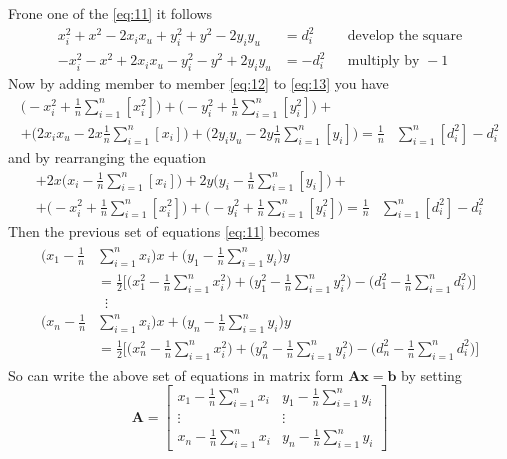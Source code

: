 \documentclass[12pt]{report}
\begin{document}
Frone one of the \ref{eq:11} it follows
\begin{align}
x_i^2+x^2-2x_ix_u+y_i^2+y^2-2y_iy_u&=d_i^2 &&\text{develop the square}\\ 
-x_i^2-x^2+2x_ix_u-y_i^2-y^2+2y_iy_u&=-d_i^2 && \text{multiply by } -1
\label{eq:13}
\end{align}
Now by adding member to member \ref{eq:12} to \ref{eq:13} you have 
\begin{equation}
\begin{split}
    \bigg(-x_i^2  + \frac{1}{n}\sum_{i=1}^n[x_i^2]\bigg)+
    \bigg(-y_i^2+ \frac{1}{n}\sum_{i=1}^n[y_i^2]\bigg)+\\
    +\bigg(2x_ix_u-2x\frac{1}{n}\sum_{i=1}^n[x_i]\bigg)+
    \bigg(2y_iy_u -2y\frac{1}{n}\sum_{i=1}^n[y_i]\bigg)
    =\frac{1}{n}&\sum_{i=1}^n[d_i^2]-d_i^2
\end{split}    
\end{equation}
and by rearranging the equation
\begin{equation}
\begin{split}
    +2x\bigg(x_i-\frac{1}{n}\sum_{i=1}^n[x_i]\bigg)+
    2y\bigg(y_i -\frac{1}{n}\sum_{i=1}^n[y_i]\bigg)+\\
    +\bigg(-x_i^2  + \frac{1}{n}\sum_{i=1}^n[x_i^2]\bigg)+
    \bigg(-y_i^2+ \frac{1}{n}\sum_{i=1}^n[y_i^2]\bigg)
    =\frac{1}{n}&\sum_{i=1}^n[d_i^2]-d_i^2
\end{split}    
\end{equation}
Then the previous set of equations \ref{eq:11} becomes
\begin{align}
\begin{split} 
    \bigg(x_1-\frac{1}{n}&\sum_{i=1}^nx_i\bigg)x+\bigg(y_1-\frac{1}{n}\sum_{i=1}^ny_i\bigg)y\\
    &=\frac{1}{2}\bigg[\bigg(x_1^2-\frac{1}{n}\sum_{i=1}^nx^2_i\bigg)+\bigg(y_1^2-\frac{1}{n}\sum_{i=1}^ny^2_i\bigg)-\bigg(d_1^2-\frac{1}{n}\sum_{i=1}^nd_i^2\bigg)\bigg]\\
&\;\;\vdots\\
    \bigg(x_n-\frac{1}{n}&\sum_{i=1}^nx_i\bigg)x+\bigg(y_n-\frac{1}{n}\sum_{i=1}^ny_i\bigg)y\\
    &=\frac{1}{2}\bigg[\bigg(x_n^2-\frac{1}{n}\sum_{i=1}^nx^2_i\bigg)+\bigg(y_n^2-\frac{1}{n}\sum_{i=1}^ny^2_i\bigg)-\bigg(d_n^2-\frac{1}{n}\sum_{i=1}^nd_i^2\bigg)\bigg]
\end{split}
\end{align}
So can write the above set of equations in matrix form $\mathbf{Ax}=\mathbf{b}$ by setting
$$
\mathbf{A}=\begin{bmatrix}
    x_1-\frac{1}{n}\sum_{i=1}^nx_i&y_1-\frac{1}{n}\sum_{i=1}^ny_i\\
    \vdots&\vdots\\
    x_n-\frac{1}{n}\sum_{i=1}^nx_i&y_n-\frac{1}{n}\sum_{i=1}^ny_i
\end{bmatrix}
$$
\end{document}
